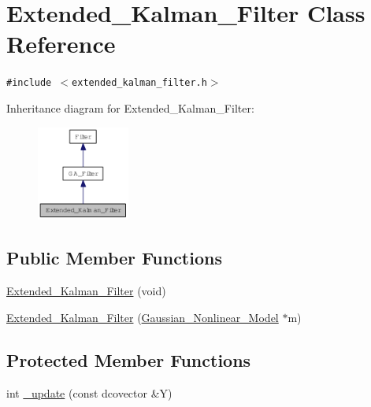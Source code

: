 \hypertarget{class_extended___kalman___filter}{
\section{Extended\_\-Kalman\_\-Filter Class Reference}
\label{class_extended___kalman___filter}
}
{\tt \#include $<$extended\_\-kalman\_\-filter.h$>$}

Inheritance diagram for Extended\_\-Kalman\_\-Filter:\nopagebreak
\begin{figure}[H]
\begin{center}
\leavevmode
\includegraphics[width=86pt]{class_extended___kalman___filter__inherit__graph}
\end{center}
\end{figure}
\subsection*{Public Member Functions}
\begin{CompactItemize}
\item 
\hyperlink{class_extended___kalman___filter_faec3e417aa36543328924021abd2bd1}{Extended\_\-Kalman\_\-Filter} (void)
\item 
\hyperlink{class_extended___kalman___filter_e236e49f87357c4e2958c885fd667092}{Extended\_\-Kalman\_\-Filter} (\hyperlink{class_gaussian___nonlinear___model}{Gaussian\_\-Nonlinear\_\-Model} $\ast$m)
\end{CompactItemize}
\subsection*{Protected Member Functions}
\begin{CompactItemize}
\item 
int \hyperlink{class_extended___kalman___filter_5cfabc6d2256b22baca0a908d29c9c7e}{\_\-update} (const dcovector \&Y)
\end{CompactItemize}


